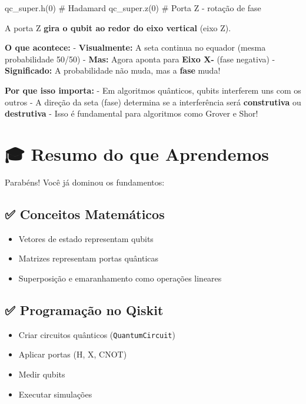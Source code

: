 \documentclass[
  brazilian,
]{report}
\newenvironment{Shaded}{\begin{snugshade}}{\end{snugshade}}
\newcommand{\CommentTok}[1]{\textcolor[rgb]{0.37,0.37,0.37}{#1}}
\newcommand{\DecValTok}[1]{\textcolor[rgb]{0.68,0.00,0.00}{#1}}
\newcommand{\NormalTok}[1]{\textcolor[rgb]{0.00,0.23,0.31}{#1}}
\providecommand{\tightlist}{%
  \setlength{\itemsep}{0pt}\setlength{\parskip}{0pt}}
\begin{document}
\begin{Shaded}
\begin{Highlighting}[]
\NormalTok{qc\_super.h(}\DecValTok{0}\NormalTok{)  }\CommentTok{\# Hadamard}
\NormalTok{qc\_super.z(}\DecValTok{0}\NormalTok{)  }\CommentTok{\# Porta Z {-} rotação de fase}
\end{Highlighting}
\end{Shaded}

A porta Z \textbf{gira o qubit ao redor do eixo vertical} (eixo Z).

\textbf{O que acontece:} - \textbf{Visualmente:} A seta continua no
equador (mesma probabilidade 50/50) - \textbf{Mas:} Agora aponta para
\textbf{Eixo X-} (fase negativa) - \textbf{Significado:} A probabilidade
não muda, mas a \textbf{fase} muda!

\textbf{Por que isso importa:} - Em algoritmos quânticos, qubits
interferem uns com os outros - A direção da seta (fase) determina se a
interferência será \textbf{construtiva} ou \textbf{destrutiva} - Isso é
fundamental para algoritmos como Grover e Shor!

\section{🎓 Resumo do que Aprendemos}\label{resumo-do-que-aprendemos}

Parabéns! Você já dominou os fundamentos:

\subsection{✅ Conceitos Matemáticos}\label{conceitos-matemuxe1ticos}

\begin{itemize}
\tightlist
\item
  Vetores de estado representam qubits
\item
  Matrizes representam portas quânticas
\item
  Superposição e emaranhamento como operações lineares
\end{itemize}

\subsection{✅ Programação no Qiskit}\label{programauxe7uxe3o-no-qiskit}

\begin{itemize}
\tightlist
\item
  Criar circuitos quânticos (\texttt{QuantumCircuit})
\item
  Aplicar portas (H, X, CNOT)
\item
  Medir qubits
\item
  Executar simulações
\end{itemize}
\end{document}
